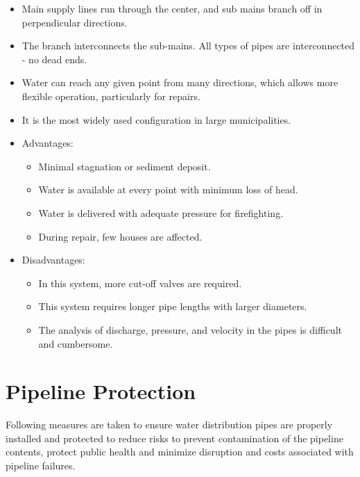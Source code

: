 \begin{itemize}
\item Main supply lines run through the center, and sub mains branch off in perpendicular directions. 
\item The branch interconnects the sub-mains. All types of pipes are interconnected - no dead ends.
\item Water can reach any given point from many directions, which allows more flexible operation, particularly for repairs.
\item  It is the most widely used configuration in large municipalities. 
\item Advantages:\\
      \begin{itemize}
        \item Minimal stagnation or sediment deposit.
        \item Water is available at every point with minimum loss of head.
        \item Water is delivered with adequate pressure for firefighting.
        \item During repair, few houses are affected.
      \end{itemize}
\item Disadvantages:\\
       \begin{itemize}
        \item In this system, more cut-off valves are required.
        \item This system requires longer pipe lengths with larger diameters.
        \item The analysis of discharge, pressure, and velocity in the pipes is difficult and cumbersome.
      \end{itemize}
      \end{itemize}

\section{Pipeline Protection} 
Following measures are taken to ensure water distribution pipes are properly installed and protected to reduce risks to prevent contamination of the pipeline contents, protect public health and minimize disruption and costs associated with pipeline failures. 

